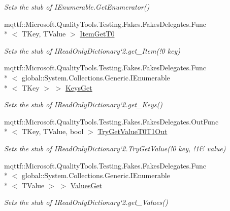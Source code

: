 \begin{DoxyCompactItemize}
\begin{DoxyCompactList}\small\item\em Sets the stub of I\-Enumerable.\-Get\-Enumerator()\end{DoxyCompactList}\item 
mqttf\-::\-Microsoft.\-Quality\-Tools.\-Testing.\-Fakes.\-Fakes\-Delegates.\-Func\\*
$<$ T\-Key, T\-Value $>$ \hyperlink{class_system_1_1_collections_1_1_generic_1_1_fakes_1_1_stub_i_read_only_dictionary_3_01_t_key_00_01_t_value_01_4_a019cc755cab2eb7ec5c88cbc88a207a5}{Item\-Get\-T0}
\begin{DoxyCompactList}\small\item\em Sets the stub of I\-Read\-Only\-Dictionary`2.get\-\_\-\-Item(!0 key)\end{DoxyCompactList}\item 
mqttf\-::\-Microsoft.\-Quality\-Tools.\-Testing.\-Fakes.\-Fakes\-Delegates.\-Func\\*
$<$ global\-::\-System.\-Collections.\-Generic.\-I\-Enumerable\\*
$<$ T\-Key $>$ $>$ \hyperlink{class_system_1_1_collections_1_1_generic_1_1_fakes_1_1_stub_i_read_only_dictionary_3_01_t_key_00_01_t_value_01_4_aab359199279169e58b9ec956674dc7de}{Keys\-Get}
\begin{DoxyCompactList}\small\item\em Sets the stub of I\-Read\-Only\-Dictionary`2.get\-\_\-\-Keys()\end{DoxyCompactList}\item 
mqttf\-::\-Microsoft.\-Quality\-Tools.\-Testing.\-Fakes.\-Fakes\-Delegates.\-Out\-Func\\*
$<$ T\-Key, T\-Value, bool $>$ \hyperlink{class_system_1_1_collections_1_1_generic_1_1_fakes_1_1_stub_i_read_only_dictionary_3_01_t_key_00_01_t_value_01_4_adca57f5a24932a3b3eb73cf79130c7ba}{Try\-Get\-Value\-T0\-T1\-Out}
\begin{DoxyCompactList}\small\item\em Sets the stub of I\-Read\-Only\-Dictionary`2.Try\-Get\-Value(!0 key, !1\& value)\end{DoxyCompactList}\item 
mqttf\-::\-Microsoft.\-Quality\-Tools.\-Testing.\-Fakes.\-Fakes\-Delegates.\-Func\\*
$<$ global\-::\-System.\-Collections.\-Generic.\-I\-Enumerable\\*
$<$ T\-Value $>$ $>$ \hyperlink{class_system_1_1_collections_1_1_generic_1_1_fakes_1_1_stub_i_read_only_dictionary_3_01_t_key_00_01_t_value_01_4_a306a49f166612a4394fe55e57f8ee504}{Values\-Get}
\begin{DoxyCompactList}\small\item\em Sets the stub of I\-Read\-Only\-Dictionary`2.get\-\_\-\-Values()\end{DoxyCompactList}\end{DoxyCompactItemize}


